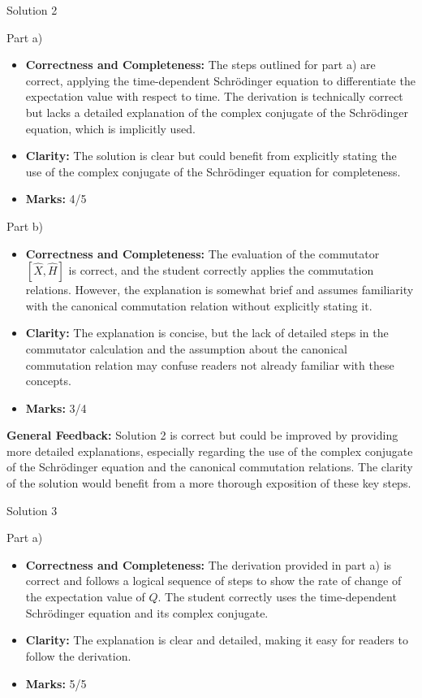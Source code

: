 \documentclass[a4paper,11pt]{article}
\begin{document}
Solution 2

Part a)

\begin{itemize}
    \item \textbf{Correctness and Completeness:} The steps outlined for part a) are correct, applying the time-dependent Schrödinger equation to differentiate the expectation value with respect to time. The derivation is technically correct but lacks a detailed explanation of the complex conjugate of the Schrödinger equation, which is implicitly used.
    \item \textbf{Clarity:} The solution is clear but could benefit from explicitly stating the use of the complex conjugate of the Schrödinger equation for completeness.
    \item \textbf{Marks:} 4/5
\end{itemize}

Part b)

\begin{itemize}
    \item \textbf{Correctness and Completeness:} The evaluation of the commutator \( \left[ \hat{X}, \hat{H}\right] \) is correct, and the student correctly applies the commutation relations. However, the explanation is somewhat brief and assumes familiarity with the canonical commutation relation without explicitly stating it.
    \item \textbf{Clarity:} The explanation is concise, but the lack of detailed steps in the commutator calculation and the assumption about the canonical commutation relation may confuse readers not already familiar with these concepts.
    \item \textbf{Marks:} 3/4
\end{itemize}

\textbf{General Feedback:} Solution 2 is correct but could be improved by providing more detailed explanations, especially regarding the use of the complex conjugate of the Schrödinger equation and the canonical commutation relations. The clarity of the solution would benefit from a more thorough exposition of these key steps.

Solution 3

Part a)

\begin{itemize}
    \item \textbf{Correctness and Completeness:} The derivation provided in part a) is correct and follows a logical sequence of steps to show the rate of change of the expectation value of \( \hat{Q} \). The student correctly uses the time-dependent Schrödinger equation and its complex conjugate.
    \item \textbf{Clarity:} The explanation is clear and detailed, making it easy for readers to follow the derivation.
    \item \textbf{Marks:} 5/5
\end{itemize}
\end{document}
